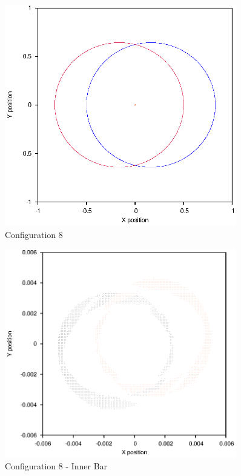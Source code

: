 \documentclass[a4paper,12pt]{article}
\begin{document}
\begin{figure}[H]
\centering
\includegraphics[width=0.9\textwidth]{./2016results/005-58-005-4/Orbit.eps}
\caption{Configuration 8}
\label{fig:config8}
\end{figure}
\begin{figure}[H]
\centering
\includegraphics[width=0.9\textwidth]{./2016results/005-58-005-4/Inner.eps}
\caption{Configuration 8 - Inner Bar}
\label{fig:config8i}
\end{figure}
\end{document}
